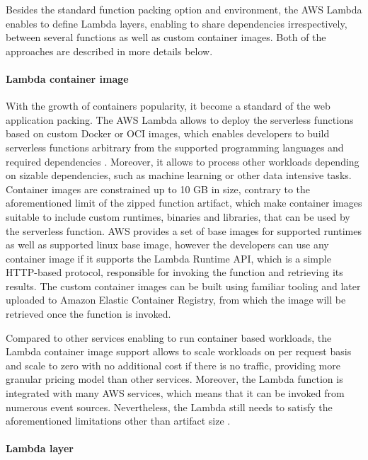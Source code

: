 Besides the standard function packing option and environment, the AWS Lambda enables to define Lambda layers, enabling to share dependencies irrespectively, between several functions as well as custom container images.
Both of the approaches are described in more details below.

\paragraph{Lambda container image}

With the growth of containers popularity, it become a standard of the web application packing. The AWS Lambda allows to deploy the serverless functions based on custom Docker or OCI images, which enables developers to build serverless functions arbitrary from the supported programming languages and required dependencies \cite{AWSLambdaContainerImage}. Moreover, it allows to process other workloads depending on sizable dependencies, such as machine learning or other data intensive tasks.
Container images are constrained up to 10 GB in size, contrary to the aforementioned limit of the zipped function artifact, which make container images suitable to include custom runtimes, binaries and libraries, that can be used by the serverless function.
AWS provides a set of base images for supported runtimes as well as supported linux base image, however the developers can use any container image if it supports the Lambda Runtime API, which is a simple HTTP-based protocol, responsible for invoking the function and retrieving its results.
The custom container images can be built using familiar tooling and later uploaded to Amazon Elastic Container Registry, from which the image will be retrieved once the function is invoked.

Compared to other services enabling to run container based workloads, the Lambda container image support allows to scale workloads on per request basis and scale to zero with no additional cost if there is no traffic, providing more granular pricing model than other services. Moreover, the Lambda function is integrated with many AWS services, which means that it can be invoked from numerous event sources. 
Nevertheless, the Lambda still needs to satisfy the aforementioned limitations other than artifact size \cite{RunningContainerImagesInAWSLambda}.

\paragraph{Lambda layer}

